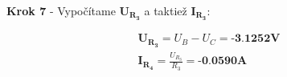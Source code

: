 \begin{center}
    \textbf{Krok 7} - Vypočítame $\boldsymbol{U_{R_3}}$ a taktiež $\boldsymbol{I_{R_3}}$:
\end{center}

\begin{gather*}
    \boldsymbol{U_{R_3}} = U_B - U_C = \textbf{-3.1252V} \\
    \boldsymbol{I_{R_4}} = \frac{U_{R_3}}{R_3} = \textbf{-0.0590A}
\end{gather*}